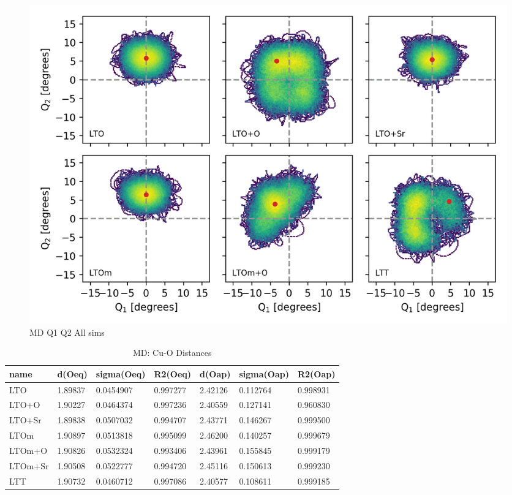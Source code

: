 \begin{figure}
	\centering
	\includegraphics[width=\textwidth]{fig/md/Q1_Q2_all.png}
	\caption[MD Q1 Q2 All sims]{MD Q1 Q2 All sims}
	\label{fig:md_q1_q2_all}
\end{figure}

\begin{table}
	\centering
	\begin{tabular}{lllllll}
		\toprule
			name &   d(Oeq) & sigma(Oeq) &  R2(Oeq) &   d(Oap) & sigma(Oap) &  R2(Oap) \\
		\midrule
			 LTO &  1.89837 &  0.0454907 &  0.997277 &  2.42126 &   0.112764 &  0.998931 \\
		   LTO+O &  1.90227 &  0.0464374 &  0.997236 &  2.40559 &   0.127141 &  0.960830 \\
		  LTO+Sr &  1.89838 &  0.0507032 &  0.994707 &  2.43771 &   0.146267 &  0.999500 \\
			LTOm &  1.90897 &  0.0513818 &  0.995099 &  2.46200 &   0.140257 &  0.999679 \\
		  LTOm+O &  1.90826 &  0.0532324 &  0.993406 &  2.43961 &   0.155845 &  0.999179 \\
		 LTOm+Sr &  1.90508 &  0.0522777 &  0.994720 &  2.45116 &   0.150613 &  0.999230 \\
			 LTT &  1.90732 &  0.0460712 &  0.997086 &  2.40577 &   0.108611 &  0.999185 \\
		\bottomrule
		\end{tabular}
	\caption{MD: Cu-O Distances}
	\label{tab:md_cu_o_distances}
\end{table}

